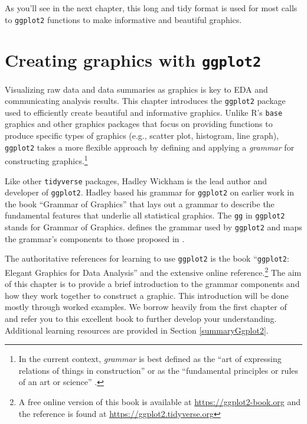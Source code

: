\documentclass[
  11pt,
]{krantz}
\theoremstyle{definition}
\theoremstyle{definition}
\theoremstyle{definition}
\theoremstyle{definition}
\theoremstyle{remark}
\begin{document}
As you'll see in the next chapter, this long and tidy format is used for most calls to \texttt{ggplot2} functions to make informative and beautiful graphics.

\hypertarget{ggplot2}{%
\chapter{\texorpdfstring{Creating graphics with \texttt{ggplot2}}{Creating graphics with ggplot2}}\label{ggplot2}}

Visualizing raw data and data summaries as graphics is key to EDA and communicating analysis results. This chapter introduces the \texttt{ggplot2} package used to efficiently create beautiful and informative graphics. Unlike R's \texttt{base} graphics and other graphics packages that focus on providing functions to produce specific types of graphics (e.g., scatter plot, histogram, line graph), \texttt{ggplot2} takes a more flexible approach by defining and applying a \emph{grammar} for constructing graphics.\footnote{In the current context, \emph{grammar} is best defined as the ``art of expressing relations of things in construction'' \citep{johnson1969grammatical} or as the ``fundamental principles or rules of an art or science'' \citep{OED}.}

Like other \texttt{tidyverse} packages, Hadley Wickham is the lead author and developer of \texttt{ggplot2}. Hadley based his grammar for \texttt{ggplot2} on earlier work in the book ``Grammar of Graphics'' \citep{wilkinson2005grammar} that lays out a grammar to describe the fundamental features that underlie all statistical graphics. The \texttt{gg} in \texttt{ggplot2} stands for Grammar of Graphics. \citet{Wickham2010JCGS} defines the grammar used by \texttt{ggplot2} and maps the grammar's components to those proposed in \citet{wilkinson2005grammar}.

The authoritative references for learning to use \texttt{ggplot2} is the book ``\texttt{ggplot2}: Elegant Graphics for Data Analysis'' \citep{WickhamGgplot2Book} and the extensive online reference.\footnote{A free online version of this book is available at \url{https://ggplot2-book.org} and the reference is found at \url{https://ggplot2.tidyverse.org}} The aim of this chapter is to provide a brief introduction to the grammar components and how they work together to construct a graphic. This introduction will be done mostly through worked examples. We borrow heavily from the first chapter of \citet{WickhamGgplot2Book} and refer you to this excellent book to further develop your understanding. Additional learning resources are provided in Section \ref{summaryGgplot2}.
\end{document}
